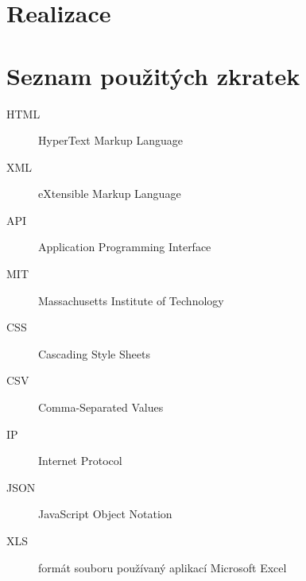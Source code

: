 \documentclass[thesis=B,czech]{FITthesis}[2012/06/26]
\begin{document}


\chapter{Realizace}




\begin{conclusion}
\end{conclusion}




\appendix




\chapter{Seznam použitých zkratek}
\begin{description}
	\item[HTML] HyperText Markup Language
	\item[XML] eXtensible Markup Language
	\item[API] Application Programming Interface
	\item[MIT] Massachusetts Institute of Technology
	\item[CSS] Cascading Style Sheets
	\item[CSV] Comma-Separated Values
	\item[IP] Internet Protocol
	\item[JSON] JavaScript Object Notation
	\item[XLS] formát souboru používaný aplikací Microsoft Excel
\end{description}
\end{document}

